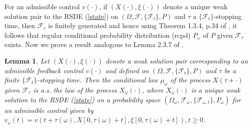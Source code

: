 \documentclass[11pt]{amsart}
\newtheorem{lemma}{\bf Lemma}[section]
\numberwithin{equation}{section}
\begin{document}
For an admissible control $v(\cdot)$, if $(X(\cdot), \xi(\cdot))$ denote a unique weak solution 
pair to the RSDE (\ref{state}) on  $(\Omega, {\mathcal F}, \{\mathcal F_t\}, P)$ and $\tau$  a
$\{\mathcal {F}_t\}$-stopping time, then ${\mathcal F}_{\tau}$ is finitely generated and hence using 
Theorem 1.3.4, p.34 of \cite{stroock_varadhan}, it follows that regular conditional probability 
distribution (rcpd) $P_{\omega}$ of $P$ given ${\mathcal F}_\tau$ exists.  
Now we prove a result analogous to Lemma 2.3.7 of \cite{arapostathis_borkar_ghosh}.
\begin{lemma}Let $(X(\cdot), \xi(\cdot))$  denote a weak solution pair corresponding to an admissible
feedback  control $v(\cdot)$ and defined on  $(\Omega, {\mathcal F}, \{\mathcal F_t\}, P)$ 
and $\tau$ be a finite   $\{\mathcal {F}_t\}$-stopping time. Then the conditional law $\mu_\omega$ 
of the process $X(\tau + \cdot)$ given  ${\mathcal F}_\tau$ is a.s. the law of the process 
$X_{\omega}(\cdot)$, where $X_{\omega}(\cdot)$
is a unique weak solution to the RSDE (\ref{state}) on a probability space 
$(\Omega_{\omega}, {\mathcal F}_{\omega}, \{\mathcal {F}_{\omega, t} \}, P_{\omega})$ for an admissible
control given by $v_{\omega} (t) = v (t + \tau(\omega), X[0, \tau(\omega) + t], \xi[0,\tau(\omega) + t] ),
 t \geq 0$.
\end{lemma}
\end{document}
